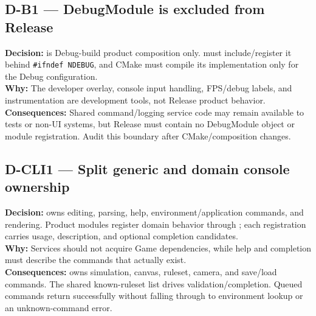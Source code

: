 \subsection*{D-B1 --- DebugModule is excluded from Release}
\begin{decisionbox}[title={D-B1 \quad 2026-08-04}]
\textbf{Decision:}  is Debug-build product composition
only.  must include/register it behind
\texttt{\#ifndef NDEBUG}, and CMake must compile its implementation only for the
Debug configuration.\\
\textbf{Why:} The developer overlay, console input handling, FPS/debug labels,
and instrumentation are development tools, not Release product behavior.\\
\textbf{Consequences:} Shared command/logging service code may remain available
to tests or non-UI systems, but Release must contain no DebugModule object or
module registration. Audit this boundary after CMake/composition changes.
\end{decisionbox}

\subsection*{D-CLI1 --- Split generic and domain console ownership}
\begin{decisionbox}[title={D-CLI1 \quad 2026-08-04}]
\textbf{Decision:}  owns editing, parsing, help,
environment/application commands, and rendering. Product modules register
domain behavior through ; each registration carries
usage, description, and optional completion candidates.\\
\textbf{Why:} Services should not acquire Game dependencies, while help and
completion must describe the commands that actually exist.\\
\textbf{Consequences:}  owns simulation, canvas,
ruleset, camera, and save/load commands. The shared known-ruleset list drives
validation/completion. Queued commands return successfully without falling
through to environment lookup or an unknown-command error.
\end{decisionbox}

